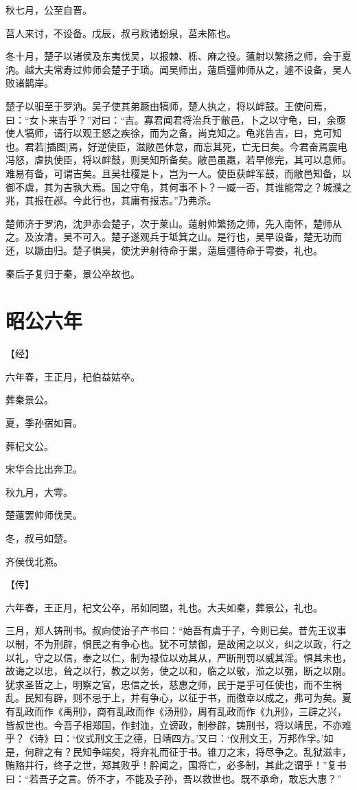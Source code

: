 \documentclass[a4paper,12pt,UTF8,twoside]{ctexbook}
\begin{document}
秋七月，公至自晋。

莒人来讨，不设备。戊辰，叔弓败诸蚡泉，莒未陈也。

冬十月，楚子以诸侯及东夷伐吴，以报棘、栎、麻之役。薳射以繁扬之师，会于夏汭。越大夫常寿过帅师会楚子于琐。闻吴师出，薳启彊帅师从之，遽不设备，吴人败诸鹊岸。

楚子以驲至于罗汭。吴子使其弟蹶由犒师，楚人执之，将以衅鼓。王使问焉，曰：“女卜来吉乎？”对曰：“吉。寡君闻君将治兵于敝邑，卜之以守龟，曰，余亟使人犒师，请行以观王怒之疾徐，而为之备，尚克知之。龟兆告吉，曰，克可知也。君若[插图]焉，好逆使臣，滋敝邑休怠，而忘其死，亡无日矣。今君奋焉震电冯怒，虐执使臣，将以衅鼓，则吴知所备矣。敝邑虽羸，若早修完，其可以息师。难易有备，可谓吉矣。且吴社稷是卜，岂为一人。使臣获衅军鼓，而敝邑知备，以御不虞，其为吉孰大焉。国之守龟，其何事不卜？一臧一否，其谁能常之？城濮之兆，其报在邲。今此行也，其庸有报志。”乃弗杀。

楚师济于罗汭，沈尹赤会楚子，次于莱山。薳射帅繁扬之师，先入南怀，楚师从之。及汝清，吴不可入。楚子遂观兵于坻箕之山。是行也，吴早设备，楚无功而还，以蹶由归。楚子惧吴，使沈尹射待命于巢，薳启彊待命于雩娄，礼也。

秦后子复归于秦，景公卒故也。


\section{昭公六年}


【经】

六年春，王正月，杞伯益姑卒。

葬秦景公。

夏，季孙宿如晋。

葬杞文公。

宋华合比出奔卫。

秋九月，大雩。

楚薳罢帅师伐吴。

冬，叔弓如楚。

齐侯伐北燕。

【传】

六年春，王正月，杞文公卒，吊如同盟，礼也。大夫如秦，葬景公，礼也。

三月，郑人铸刑书。叔向使诒子产书曰：“始吾有虞于子，今则已矣。昔先王议事以制，不为刑辟，惧民之有争心也。犹不可禁御，是故闲之以义，纠之以政，行之以礼，守之以信，奉之以仁，制为禄位以劝其从，严断刑罚以威其淫。惧其未也，故诲之以忠，耸之以行，教之以务，使之以和，临之以敬，涖之以强，断之以刚。犹求圣哲之上，明察之官，忠信之长，慈惠之师，民于是乎可任使也，而不生祸乱。民知有辟，则不忌于上，并有争心，以征于书，而徼幸以成之，弗可为矣。夏有乱政而作《禹刑》，商有乱政而作《汤刑》，周有乱政而作《九刑》，三辟之兴，皆叔世也。今吾子相郑国，作封洫，立谤政，制参辟，铸刑书，将以靖民，不亦难乎？《诗》曰：‘仪式刑文王之德，日靖四方。’又曰：‘仪刑文王，万邦作孚。’如是，何辟之有？民知争端矣，将弃礼而征于书。锥刀之末，将尽争之。乱狱滋丰，贿赂并行，终子之世，郑其败乎！肸闻之，国将亡，必多制，其此之谓乎！”复书曰：“若吾子之言。侨不才，不能及子孙，吾以救世也。既不承命，敢忘大惠？”
\end{document}
